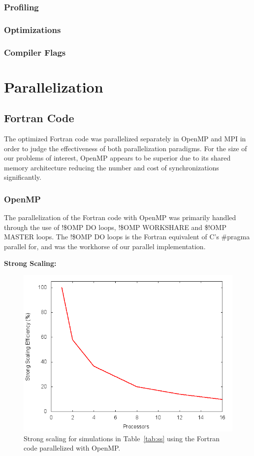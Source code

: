 \documentclass{scrartcl}
\begin{document}
  \subsubsection{Profiling}
       
  \subsubsection{Optimizations}
  \subsubsection{Compiler Flags}
  
  \section{Parallelization}
  \subsection{Fortran Code}    
  The optimized Fortran code was parallelized separately in OpenMP and MPI in order to judge the effectiveness of both parallelization paradigms. For the size of our problems of interest, OpenMP appears to be superior due to its shared memory architecture reducing the number and cost of synchronizations significantly.
  \subsubsection{OpenMP}
  The parallelization of the Fortran code with OpenMP was primarily handled through the use of !\$OMP DO loops, !\$OMP WORKSHARE and \$!OMP MASTER loops. The !\$OMP DO loops is the Fortran equivalent of C's \#pragma parallel for, and was the workhorse of our parallel implementation.
  
  \textbf{Strong Scaling:}
  \begin{figure}
  	\begin{center}
	  	\includegraphics[width=0.7\columnwidth]{./fort_scaling/ss.png}
	  	\caption{Strong scaling for simulations in Table~\ref{tab:ss} using the Fortran code parallelized with OpenMP.}
		\label{fig:ss_fort_omp}
  	\end{center}
  \end{figure}
  
\end{document}
